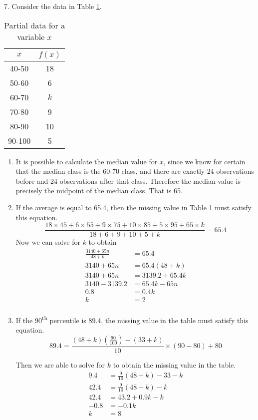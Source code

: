 \documentclass[fleqn]{article}
\begin{document}
\begin{answers}
	\item[7.]
	Consider the data in Table \ref{q7}.
	\begin{table}[htb]
		\centering
		\begin{tabular}{||c|c||}
			\hline
			\(x\) & \(f(x)\) \\
			\hline
			40-50 & 18 \\
			50-60 & 6 \\
			60-70 & \(k\) \\
			70-80 & 9 \\
			80-90 & 10 \\
			90-100 & 5 \\
			\hline
		\end{tabular}
		\caption{Partial data for a variable \(x\)}
		\label{q7}
	\end{table}
	\begin{enumerate}
		\item %
		It is possible to calculate the median value for \(x\), since we know for certain that the median class is the 60-70 class, and there are exactly 24 observations before and 24 observations after that class. Therefore the median value is precisely the midpoint of the median class. That is 65.

		\item %
		If the average is equal to 65.4, then the missing value in Table \ref{q7} must satisfy this equation.
		\[\frac{18 \times 45 + 6 \times 55 + 9 \times 75 + 10 \times 85 + 5 \times 95 + 65 \times k}{18 + 6 + 9 + 10 + 5 + k} = 65.4\]
		Now we can solve for \(k\) to obtain
		\begin{align*}
			\frac{3140 + 65n}{48 + k} &= 65.4 \\
			3140 + 65n &= 65.4(48 + k) \\
			3140 + 65n &= 3139.2 + 65.4k \\
			3140 - 3139.2 &= 65.4k - 65n \\
			0.8 &= 0.4k \\
			k &= 2 \\
		\end{align*}

		\item %
		If the 90\textsuperscript{th} percentile is 89.4, the missing value in the table must satisfy this equation.
		\[89.4 = \frac{(48 + k)\left(\frac{90}{100}\right) - (33 + k)}{10} \times (90 - 80) + 80\]

		Then we are able to solve for \(k\) to obtain the missing value in the table.
		\begin{align*}
			9.4 &= \frac{9}{10}(48 + k) - 33 - k \\
			42.4 &= \frac{9}{10}(48 + k) - k \\
			42.4 &= 43.2 + 0.9k - k \\
			-0.8 &= - 0.1k \\
			k &= 8 \\
		\end{align*}
	\end{enumerate}


\end{answers}
\end{document}
